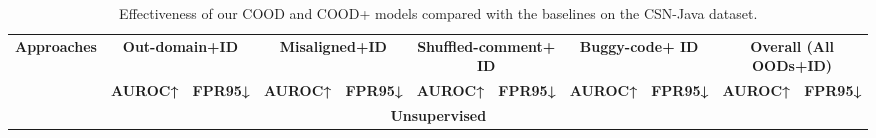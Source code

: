 \begin{table*}[thb]
\begin{adjustbox}{width=0.9\textwidth}
\begin{tabular}{|ccccccccccc|}

										

\end{tabular}
\end{adjustbox}
\end{table*}


\begin{table*}[]
\centering
\footnotesize
\caption{Effectiveness of our COOD and COOD+ models compared with the baselines on the CSN-Java dataset.}%
\label{tab:results-java}
\begin{adjustbox}{width=0.9\textwidth}\small
\begin{tabular}{|ccccccccccc|}
\hline
\multicolumn{1}{|c|}{\multirow{2}{*}{\textbf{Approaches}}} & \multicolumn{2}{c|}{\textbf{Out-domain+ID}}                                 & \multicolumn{2}{c|}{\textbf{Misaligned+ID}}                                 & \multicolumn{2}{c|}{\textbf{Shuffled-comment+ ID}}                          & \multicolumn{2}{c|}{\textbf{Buggy-code+ ID}}                                & \multicolumn{2}{c|}{\textbf{Overall (All OODs+ID)}}    \\ \cline{2-11} 
\multicolumn{1}{|c|}{}                                     & \multicolumn{1}{c|}{\textbf{AUROC↑}} & \multicolumn{1}{c|}{\textbf{FPR95↓}} & \multicolumn{1}{c|}{\textbf{AUROC↑}} & \multicolumn{1}{c|}{\textbf{FPR95↓}} & \multicolumn{1}{c|}{\textbf{AUROC↑}} & \multicolumn{1}{c|}{\textbf{FPR95↓}} & \multicolumn{1}{c|}{\textbf{AUROC↑}} & \multicolumn{1}{c|}{\textbf{FPR95↓}} & \multicolumn{1}{c|}{\textbf{AUROC↑}} & \textbf{FPR95↓} \\ \hline
\multicolumn{11}{|c|}{\textbf{Unsupervised}}                                                                                                                                                                                                                                                                                                                                                                              \\ \hline

\end{tabular}
\end{adjustbox}
\end{table*}
